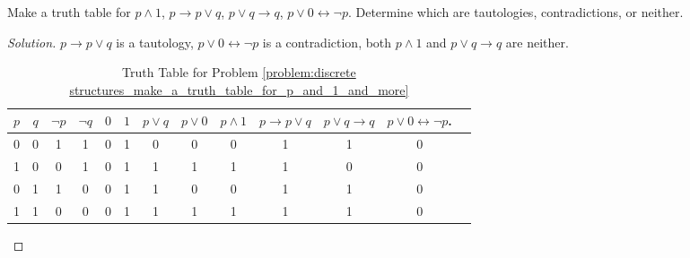     \begin{problem}
    \label{problem:discrete structures_make_a_truth_table_for_p_and_1_and_more}
    Make a truth table for $p\land 1$, $p\rightarrow p\lor q$, $p\lor q \rightarrow q$, $p\lor 0 \leftrightarrow \neg p$. Determine which are tautologies, contradictions, or neither.
    \end{problem}
    \begin{proof}[Solution]
    $p\rightarrow p\lor q$ is a tautology, $p\lor 0 \leftrightarrow \neg p$ is a
    contradiction, both $p\land 1$ and $p\lor q \rightarrow q$ are neither. 
    \begin{table}[H]
        \centering
        \captionsetup{type=table}
        \begin{tabular}{c c c c c c c c c c c c c} 
             \hline 
             $p$ & $q$ & $\neg p$ & $\neg q$ & $0$ & $1$ & $p\lor q$ & $p \lor 0$ & $p\land 1$ & $p\rightarrow p\lor q$ & $p\lor q \rightarrow q$ & $p\lor 0 \leftrightarrow \neg p$.\\ [0.5ex] 
             \hline
             0 & 0 & 1 & 1 & 0 & 1 & 0 & 0 & 0 & 1 & 1 & 0 \\
             1 & 0 & 0 & 1 & 0 & 1 & 1 & 1 & 1 & 1 & 0 & 0 \\
             0 & 1 & 1 & 0 & 0 & 1 & 1 & 0 & 0 & 1 & 1 & 0 \\
             1 & 1 & 0 & 0 & 0 & 1 & 1 & 1 & 1 & 1 & 1 & 0 \\
             \hline
        \end{tabular}
        \caption{Truth Table for Problem \ref{problem:discrete structures_make_a_truth_table_for_p_and_1_and_more}}
    \end{table}
    \end{proof}
